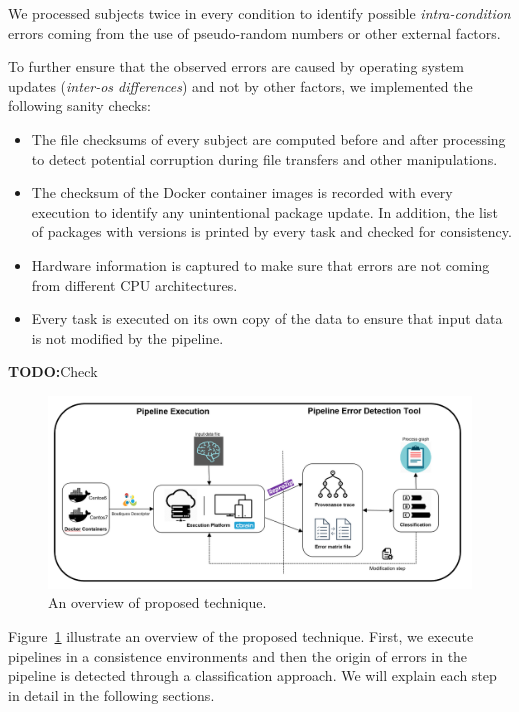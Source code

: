 \documentclass{article}
\newcommand{\todo}[1]{\color{red}\textbf{TODO:}#1\color{black}}
\begin{document}
We processed subjects twice in every condition to identify possible \emph{intra-condition} errors coming from the use of pseudo-random numbers or other external
factors. 

To further ensure that the observed errors are caused by operating system
updates (\emph{inter-os differences}) and not by other factors, we
implemented the following sanity checks:
\begin{itemize}
\item The file checksums of every
subject are computed before and after processing to detect potential corruption during file transfers and other manipulations.
\item The checksum of the Docker container images is recorded with
  every execution to identify any unintentional package update. In
  addition, the list of packages with versions is printed by every
  task and checked for consistency.
\item Hardware information is captured to make sure that errors are
  not coming from different CPU architectures.
\item Every task is executed on its own copy of the data to ensure
  that input data is not modified by the pipeline. 
\end{itemize}

\todo{Check ~\cite{DBLP:journals/fini/DasGRSPMSRSKMKR17}}

\begin{figure}[H]
\centering
  \includegraphics[scale=0.9]{images/overview.png}
  \caption{An overview of proposed technique.}
  \label{fig:overview}
\end{figure}

Figure~\ref{fig:overview} illustrate an overview of the proposed technique. First, we execute pipelines in a
consistence environments and then the origin of errors in the pipeline is detected through a
classification approach. We will explain each step in detail in the following sections.
\end{document}
